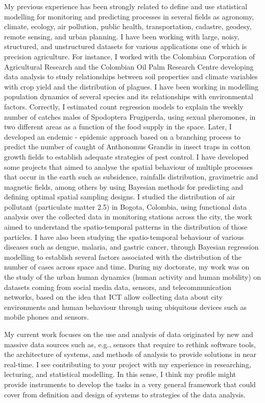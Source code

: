 \documentclass[11pt, a4paper]{awesome-cv}
\begin{document}
\begin{cvletter}
My previous experience has been strongly related to define and use statistical modelling for monitoring and predicting processes in several fields as agronomy, climate, ecology, air pollution, public health, transportation, cadastre, geodesy, remote sensing, and urban planning. I have been working with large, noisy, structured, and unstructured datasets for various applications one of which is precision agriculture. For instance, I worked with the Colombian Corporation of Agricultural Research and the Colombian Oil Palm Research Centre developing data analysis to study relationships between soil properties and climate variables with crop yield and the distribution of plagues. I have been working in modelling population dynamics of several species and its relationships with environmental factors. Correctly, I estimated count regression models to explain the weekly number of catches males of Spodoptera Frugiperda, using sexual pheromones, in two different areas as a function of the food supply in the space. Later, I developed an endemic - epidemic approach based on a branching process to predict the number of caught of Anthonomus Grandis in insect traps in cotton growth fields to establish adequate strategies of pest control. I have developed some projects that aimed to analyse the spatial behaviour of multiple processes that occur in the earth such as subsidence, rainfalls distribution, gravimetric and magnetic fields, among others by using Bayesian methods for predicting and defining optimal spatial sampling designs. I studied the distribution of air pollutant (particulate matter 2.5) in Bogota, Colombia, using functional data analysis over the collected data in monitoring stations across the city, the work aimed to understand the spatio-temporal patterns in the distribution of those particles. I have also been studying the spatio-temporal behaviour of various diseases such as dengue, malaria, and gastric cancer, through Bayesian regression modelling to establish several factors associated with the distribution of the number of cases across space and time. During my doctorate, my work was on the study of the urban human dynamics (human activity and human mobility) on datasets coming from social media data, sensors, and telecommunication networks, based on the idea that ICT allow collecting data about city environments and human behaviour through using ubiquitous devices such as mobile phones and sensors.\par
My current work focuses on the use and analysis of data originated by new and massive data sources such as, e.g., sensors that require to rethink software tools, the architecture of systems, and methods of analysis to provide solutions in near real-time. I see contributing to your project with my experience in researching, lecturing, and statistical modelling. In this sense, I think my profile might provide instruments to develop the tasks in a very general framework that could cover from definition and design of systems to strategies of the data analysis.\par

\end{cvletter}
\end{document}
